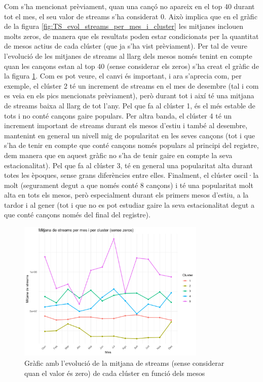 \documentclass{article}
\begin{document}
Com s'ha mencionat prèviament, quan una cançó no apareix en el top 40 durant tot el mes, el seu valor de streams s'ha considerat 0. Això implica que en el gràfic de la figura \ref{fig:TS_evol_streams_per_mes_i_cluster} les mitjanes inclouen molts zeros, de manera que els resultats poden estar condicionats per la quantitat de mesos actius de cada clúster (que ja s'ha vist prèviament). Per tal de veure l'evolució de les mitjanes de streams al llarg dels mesos només tenint en compte quan les cançons estan al top 40 (sense considerar els zeros) s'ha creat el gràfic de la figura \ref{fig:TS_evol_streams_per_mes_i_cluster_no_zeros}. Com es pot veure, el canvi és important, i ara s'aprecia com, per exemple, el clúster 2 té un increment de streams en el mes de desembre (tal i com es veia en els pics mencionats prèviament), però durant tot i així té una mitjana de streams baixa al llarg de tot l'any. Pel que fa al clúster 1, és el més estable de tots i no conté cançons gaire populars. Per altra banda, el clúster 4 té un increment important de streams durant els mesos d'estiu i també al desembre, mantenint en general un nivell mig de popularitat en les seves cançons (tot i que s'ha de tenir en compte que conté cançons només populars al principi del registre, dem manera que en aquest gràfic no s'ha de tenir gaire en compte la seva estacionalitat). Pel que fa al clúster 3, té en general una popularitat alta durant totes les èpoques, sense grans diferències entre elles. Finalment, el clúster oscil·la molt (segurament degut a que només conté 8 cançons) i té una popularitat molt alta en tots els mesos, però especialment durant els primers mesos d'estiu, a la tardor i al gener (tot i que no es pot estudiar gaire la seva estacionalitat degut a que conté cançons només del final del registre).

\begin{figure}[H]
    \centering
    \includegraphics[width=0.8\textwidth]{Images/4_clustering/time_series/evol_streams_per_mes_i_cluster_no_0.png}
    \caption{Gràfic amb l'evolució de la mitjana de streams (sense considerar quan el valor és zero) de cada clúster en funció dels mesos}
    \label{fig:TS_evol_streams_per_mes_i_cluster_no_zeros}
\end{figure}
\end{document}
